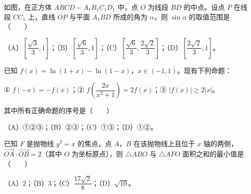 \begin{question}
如图，在正方体 $ABCD-A_1B_1C_1D_1$ 中，点 $O$ 为线段 $BD$ 的中点。设点 $P$ 在线段 $CC_1$ 上，直线 $OP$ 与平面 $A_1BD$ 所成的角为 $\alpha$，则 $\sin\alpha$ 的取值范围是\mbox{（　　）}

（A）$\left[\dfrac{\sqrt3}3,1\right]$；（B）$\left[\dfrac{\sqrt6}3,1\right]$；（C）$\left[\dfrac{\sqrt6}3,\dfrac{2\sqrt2}3\right]$；（D）$\left[\dfrac{2\sqrt2}3,1\right]$。
\nopagebreak[4]
\begin{center}\end{center}
\nopagebreak[4]
\end{question}
\begin{question}
已知 $f(x)=\ln(1+x)-\ln(1-x)$，$x\in(-1,1)$。现有下列命题：

① $f(-x)=-f(x)$；② $f\left(\dfrac{2x}{x^2+1}\right)=2f(x)$；③ $|f(x)|\geqslant 2|x|$。

其中所有正确命题的序号是\mbox{（　　）}

（A）①②③；（B）②③；（C）①③；（D）①②。

\end{question}
\begin{question}
已知 $F$ 是抛物线 $y^2=x$ 的焦点，点 $A$，$B$ 在该抛物线上且位于 $x$ 轴的两侧，$\overrightarrow{OA}\cdot\overrightarrow{OB}=2$（其中 $O$ 为坐标原点），则 $\triangle ABO$ 与 $\triangle AFO$ 面积之和的最小值是\mbox{（　　）}

（A）$2$；（B）$3$；（C）$\dfrac{17\sqrt2}8$；（D）$\sqrt{10}$。

\end{question}

